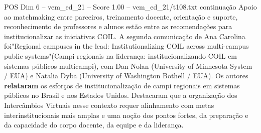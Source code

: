 \begin{textsample}{POS Dim 6 – vem\_ed\_21 – Score 1.00 – vem\_ed\_21/t108.txt}  \label{ex:f6_pos_124}
continuação Apoio ao matchmaking entre parceiros, treinamento docente, orientação e suporte, reconhecimento de professores e alunos estão entre as recomendações para institucionalizar as iniciativas COIL.
A segunda comunicação de Ana Carolina foi"Regional campuses in the lead: Institutionalizing COIL across multi-campus public systems"(Campi regionais na liderança: institucionalizando COIL em sistemas públicos multicampi), com Dan Nolan (University of Minnesota System / EUA) e Natalia Dyba (University of Washington Bothell / EUA).
Os autores \textbf{relataram} os esforços de institucionalização de campi regionais em sistemas públicos no Brasil e nos Estados Unidos.
Destacaram que a organização dos Intercâmbios Virtuais nesse contexto requer alinhamento com metas interinstitucionais mais amplas e uma noção dos pontos fortes, da preparação e da capacidade do corpo docente, da equipe e da liderança.

\end{textsample}

